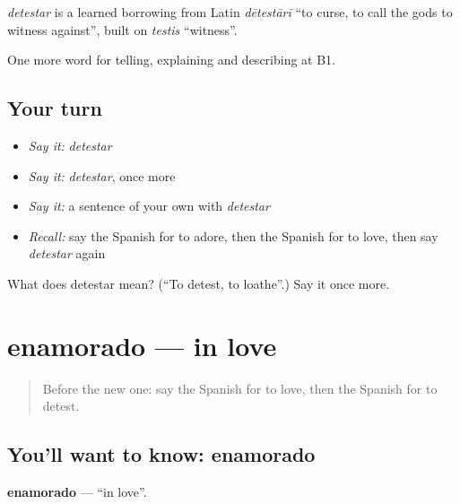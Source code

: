 \begin{cousinweb}
\emph{detestar} is a learned borrowing from Latin \emph{dētestārī} \textquotedblleft{}to curse, to call the gods to witness against\textquotedblright{}, built on \emph{testis} \textquotedblleft{}witness\textquotedblright{}.
\end{cousinweb}

\begin{grammarlens}[title={What you've built}]
One more word for telling, explaining and describing at B1.
\end{grammarlens}

\subsection*{Your turn}
\begin{itemize}
\raggedright
  \item \emph{Say it:} \emph{detestar}
  \item \emph{Say it:} \emph{detestar}, once more
  \item \emph{Say it:} a sentence of your own with \emph{detestar}
  \item \emph{Recall:} say the Spanish for to adore, then the Spanish for to love, then say \emph{detestar} again
\end{itemize}

\begin{tcolorbox}[breakable,colback=teal!4,colframe=teal!35!black,title={Before you move on}]
What does detestar mean? (\textquotedblleft{}To detest, to loathe\textquotedblright{}.) Say it once more.
\end{tcolorbox}
\section[enamorado]{enamorado — in love}

\label{lesson:ES-C715-enamorado}



\begin{quote}
Before the new one: say the Spanish for to love, then the Spanish for to detest.
\end{quote}

\subsection*{You'll want to know: enamorado}
\textbf{enamorado} — \textquotedblleft{}in love\textquotedblright{}.

